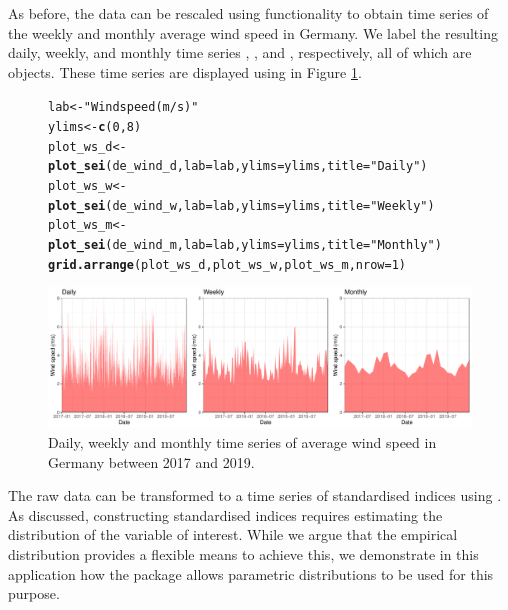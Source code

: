 \documentclass[article,shortnames,nojss]{jss}\usepackage[]{graphicx}\usepackage[]{xcolor}
\makeatletter
\newcommand{\hlnum}[1]{\textcolor[rgb]{0.686,0.059,0.569}{#1}}%
\newcommand{\hlstr}[1]{\textcolor[rgb]{0.192,0.494,0.8}{#1}}%
\newcommand{\hlstd}[1]{\textcolor[rgb]{0.345,0.345,0.345}{#1}}%
\newcommand{\hlkwb}[1]{\textcolor[rgb]{0.69,0.353,0.396}{#1}}%
\newcommand{\hlkwc}[1]{\textcolor[rgb]{0.333,0.667,0.333}{#1}}%
\newcommand{\hlkwd}[1]{\textcolor[rgb]{0.737,0.353,0.396}{\textbf{#1}}}%
\newenvironment{kframe}{%
 \def\at@end@of@kframe{}%
 \ifinner\ifhmode%
  \def\at@end@of@kframe{\end{minipage}}%
  \begin{minipage}{\columnwidth}%
 \fi\fi%
 \def\FrameCommand##1{\hskip\@totalleftmargin \hskip-\fboxsep
 \colorbox{shadecolor}{##1}\hskip-\fboxsep
     \hskip-\linewidth \hskip-\@totalleftmargin \hskip\columnwidth}%
 \MakeFramed {\advance\hsize-\width
   \@totalleftmargin\z@ \linewidth\hsize
   \@setminipage}}%
 {\par\unskip\endMakeFramed%
 \at@end@of@kframe}
\newenvironment{knitrout}{}{} %
\makeatother
\begin{document}
As before, the data can be rescaled using  functionality to obtain time series of the weekly and monthly average wind speed in Germany. We label the resulting daily, weekly, and monthly time series , , and , respectively, all of which are  objects. These time series are displayed using  in Figure \ref{fig:ts_ws_raw}.



\begin{figure}
\begin{knitrout}
\color{fgcolor}\begin{kframe}
\begin{alltt}
\hlstd{lab} \hlkwb{<-} \hlstr{"Wind speed (m/s)"}
\hlstd{ylims} \hlkwb{<-} \hlkwd{c}\hlstd{(}\hlnum{0}\hlstd{,} \hlnum{8}\hlstd{)}
\hlstd{plot_ws_d} \hlkwb{<-} \hlkwd{plot_sei}\hlstd{(de_wind_d,} \hlkwc{lab} \hlstd{= lab,} \hlkwc{ylims} \hlstd{= ylims,} \hlkwc{title} \hlstd{=} \hlstr{"Daily"}\hlstd{)}
\hlstd{plot_ws_w} \hlkwb{<-} \hlkwd{plot_sei}\hlstd{(de_wind_w,} \hlkwc{lab} \hlstd{= lab,} \hlkwc{ylims} \hlstd{= ylims,} \hlkwc{title} \hlstd{=} \hlstr{"Weekly"}\hlstd{)}
\hlstd{plot_ws_m} \hlkwb{<-} \hlkwd{plot_sei}\hlstd{(de_wind_m,} \hlkwc{lab} \hlstd{= lab,} \hlkwc{ylims} \hlstd{= ylims,} \hlkwc{title} \hlstd{=} \hlstr{"Monthly"}\hlstd{)}
\hlkwd{grid.arrange}\hlstd{(plot_ws_d, plot_ws_w, plot_ws_m,} \hlkwc{nrow} \hlstd{=} \hlnum{1}\hlstd{)}
\end{alltt}
\end{kframe}

{\centering \includegraphics[width=\linewidth]{figure/plot_raw_ts_wind-1} 

}


\end{knitrout}
\caption{Daily, weekly and monthly time series of average wind speed in Germany between 2017 and 2019.}
\label{fig:ts_ws_raw}
\end{figure}

The raw data can be transformed to a time series of standardised indices using . As discussed, constructing standardised indices requires estimating the distribution of the variable of interest. While we argue that the empirical distribution provides a flexible means to achieve this, we demonstrate in this application how the  package allows parametric distributions to be used for this purpose.
\end{document}
